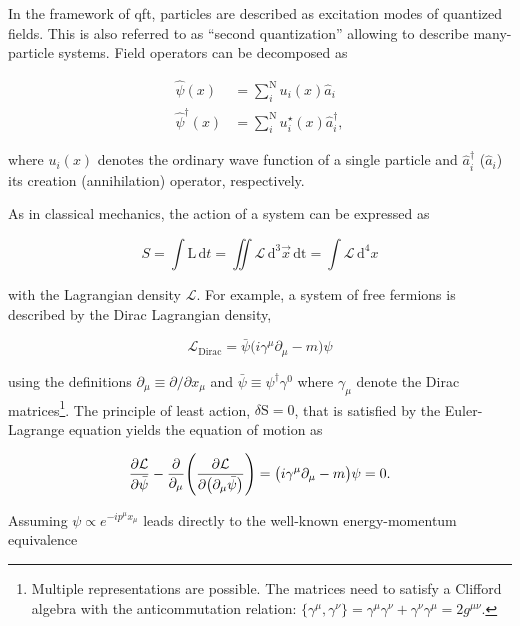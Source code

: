 In the framework of \gls{qft}, particles are described as excitation modes of quantized fields. This is also referred to as ``second quantization'' allowing to describe many-particle systems. Field operators can be decomposed as

\begin{align}
    \hat{\psi}(x)&=\sum_{i}^{\mathrm{N}}u_{i}(x)\hat{a}_{i} \\
    \hat{\psi}^{\dagger}(x)&=\sum_{i}^{\mathrm{N}}u^{\star}_{i}(x)\hat{a}^{\dagger}_{i},
\end{align}

where $u_{i}(x)$ denotes the ordinary wave function of a single particle and $\hat{a}^{\dagger}_{i}$ ($\hat{a}_{i}$) its creation (annihilation) operator, respectively.

As in classical mechanics, the action of a system can be expressed as

\begin{equation}
S=\int\mathrm{L}\,\mathrm{d}t=\iint\mathcal{L}\,\mathrm{d}^{3}\vec{x}\,\mathrm{dt}=\int\mathcal{L}\,\mathrm{d}^{4}x
\end{equation}

with the Lagrangian density $\mathcal{L}$. For example, a system of free fermions is described by the Dirac Lagrangian density,

\begin{equation}
\label{eq:theory-diracL}
\mathcal{L}_\mathrm{Dirac}=\bar{\psi}\big(i\gamma^\mu\partial_\mu-m\big)\psi
\end{equation}

using the definitions $\partial_\mu\equiv\partial/\partial x_\mu$ and $\bar{\psi}\equiv\psi^\dagger\gamma^{0}$ where $\gamma_\mu$ denote the Dirac matrices\footnote{Multiple representations are possible. The matrices need to satisfy a Clifford algebra with the anticommutation relation: $\big\{\gamma^\mu,\gamma^\nu\big\}=\gamma^\mu\gamma^\nu+\gamma^\nu\gamma^\mu=2g^{\mu\nu}$.}. The principle of least action, $\delta \mathrm{S}=0$, that is satisfied by the Euler-Lagrange equation yields the equation of motion as

\begin{equation}
\frac{\partial\mathcal{L}}{\partial\bar{\psi}}-\frac{\partial}{\partial_\mu}\Bigg(\frac{\partial\mathcal{L}}{\partial\big(\partial_\mu\bar{\psi}\big)}\Bigg)=\big(i\gamma^\mu\partial_\mu-m\big)\psi=0. \\
\end{equation}

Assuming $\psi\propto e^{-ip^{\mu}x_{\mu}}$ leads directly to the well-known energy-momentum equivalence

